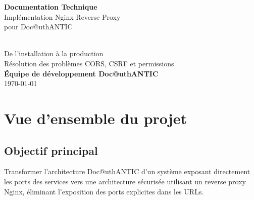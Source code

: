 \documentclass[12pt,a4paper]{article}
\begin{document}
\begin{titlepage}
    \centering
    \vspace*{2cm}
    
    {\Huge\bfseries Documentation Technique}\\[0.5cm]
    {\LARGE Implémentation Nginx Reverse Proxy}\\[0.3cm]
    {\LARGE pour Doc@uthANTIC}\\[2cm]
    
    \\[2cm]
    
    {\large De l'installation à la production}\\[1cm]
    {\large Résolution des problèmes CORS, CSRF et permissions}\\[3cm]
    
    {\large\textbf{Équipe de développement Doc@uthANTIC}}\\[0.5cm]
    {\large\today}
\end{titlepage}

\tableofcontents
\newpage


\section{Vue d'ensemble du projet}

\subsection{Objectif principal}

Transformer l'architecture Doc@uthANTIC d'un système exposant directement les ports des services vers une architecture sécurisée utilisant un reverse proxy Nginx, éliminant l'exposition des ports explicites dans les URLs.
\end{document}
